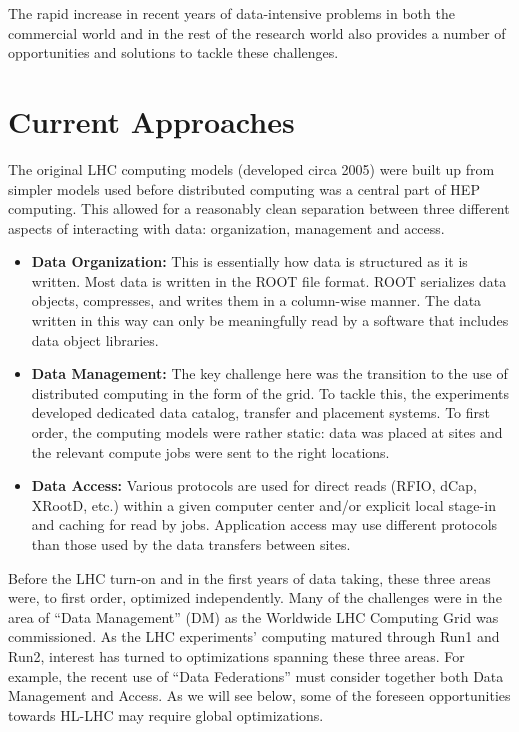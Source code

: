 \documentclass[12pt,a4paper]{article}
\begin{document}
The rapid increase in recent years of data-intensive problems in both
the commercial world and in the rest of the research world also provides
a number of opportunities and solutions to tackle these challenges.

\section{Current Approaches}\label{current-approaches}

The original LHC computing models (developed circa 2005) were built up from
simpler models used before distributed computing was a central part of
HEP computing. This allowed for a reasonably clean separation between
three different aspects of interacting with data: organization,
management and access.

\begin{itemize}
\item \textbf{Data Organization:} This is essentially how data is structured
  as it is written. Most data is written in the ROOT file format. ROOT serializes data objects, compresses, and writes them in a column-wise manner. The data written in this way can only be meaningfully read  by a software that includes data object libraries.
\item \textbf{Data Management:} The key challenge here was the transition to
  the use of distributed computing in the form of the grid. To tackle this, the
  experiments developed dedicated data catalog,  transfer and placement systems. To first
  order, the computing models were rather static: data was placed at
  sites and the relevant compute jobs were sent to the right locations.
\item \textbf{Data Access:} Various protocols are used for direct reads
  (RFIO, dCap, XRootD, etc.) within a given computer center and/or
  explicit local stage-in and caching for read by jobs. Application
  access may use different protocols than those used by the data
  transfers between sites.
\end{itemize}

Before the LHC turn-on and in the first years of data taking, these three
areas were, to first order, optimized independently. Many of the
challenges were in the area of ``Data Management'' (DM) as the Worldwide
LHC Computing Grid was commissioned. As the LHC experiments' computing matured
through Run1 and Run2, interest has turned to optimizations spanning
these three areas. For example, the recent use of ``Data Federations''
must consider together both Data Management and Access. As we will see below, some of the
foreseen opportunities towards HL-LHC may require global optimizations.
\end{document}
